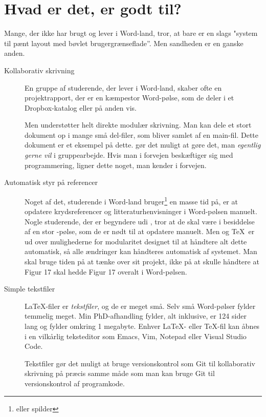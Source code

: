 \section{Hvad er det, \latex  er godt til?}\label{afs:hvorfor}

Mange, der ikke har brugt \latex  og lever i Word-land, tror, at
\latex  bare er en slags "system til pænt layout med bøvlet brugergrænseflade''.
Men sandheden er en ganske anden. 

\begin{description}
\item[Kollaborativ skrivning] En gruppe af studerende, der lever i Word-land,
  skaber ofte en projektrapport, der er en kæmpestor Word-pølse, som de deler i
  et Dropbox-katalog eller på anden vis.

  Men \latex  understøtter helt direkte modulær skrivning. Man kan
  dele et stort dokument op i mange små del-filer, som bliver samlet
  af en main-fil. Dette dokument er et eksempel på dette. \latex gør
  det muligt at gøre det, man \emph{egentlig gerne vil} i
  gruppearbejde. Hvis man i forvejen beskæftiger sig med
  programmering, ligner dette noget, man kender i forvejen.
  
\item[Automatisk styr på referencer] Noget af det, studerende i
  Word-land bruger\footnote{eller spilder} en masse tid på, er at
  opdatere krydsreferencer og litteraturhenvisninger i Word-pølsen
  manuelt. Nogle studerende, der er begyndere udi \latex, tror at de
  skal være i besiddelse af en stor \latex-pølse, som de er nødt til
  at opdatere manuelt. Men \latex og \TeX\ er ud over mulighederne for
  modularitet designet til at håndtere alt dette automatisk, så alle
  ændringer kan håndteres automatisk af systemet. Man skal bruge tiden
  på at tænke over sit projekt, ikke på at skulle håndtere at Figur 17 skal hedde
  Figur 17 overalt i Word-pølsen.

\item[Simple tekstfiler] \LaTeX-filer er \textsl{tekstfiler}, og de er meget
  små. Selv små Word-pølser fylder temmelig meget. Min PhD-afhandling
  fylder, alt inklusive, er 124 sider lang og fylder omkring 1
  megabyte. Enhver \LaTeX- eller \TeX-fil kan åbnes i en vilkårlig
  teksteditor som Emacs, Vim, Notepad eller Visual Studio Code.

  Tekstfiler gør det muligt at bruge versionskontrol som Git til
  kollaborativ skrivning på præcis samme måde som man kan bruge Git
  til versionskontrol af programkode.


\end{description}
